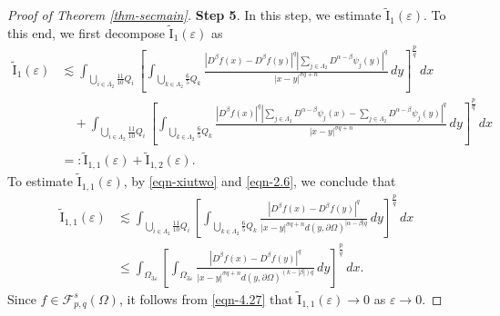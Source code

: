 \documentclass[11pt,twoside]{article}
\def\hf{{\mathscr F }}
\def\Qi{\frac{11}{10}Q_i}
\def\Qkk{\frac{6}{5}Q_k}
\def\az{\alpha}
\def\bz{\beta}
\def\boz{{\Omega}}
\def\sz{\sigma}
\def\vez{\varepsilon}
\def\pa{\partial}                %
\def\huafweab{{\hf}_{p,q}^{s}(\boz)}
\theoremstyle{mylem}
\theoremstyle{definition}
\numberwithin{equation}{section}
\begin{document}
\begin{proof}[Proof of Theorem \ref{thm-secmain}]
{\bf Step 5}. In this step, we estimate \( \tilde{\mathrm{I}}_1(\vez) \). To this end, we first decompose \( \tilde{\mathrm{I}}_1(\vez) \) as
\begin{align*}
\tilde{\mathrm{I}}_1(\vez)
&\lesssim \int_{\bigcup_{i \in \Lambda_2} \Qi} \left[ \int_{\bigcup_{k \in \Lambda_2}\Qkk} \frac{|D^\beta f(x) - D^\beta f(y)|^q |\sum_{j\in\Lambda_2}D^{\alpha - \beta} \psi_j(y)|^q}{|x - y|^{\sz q + n}}\,dy \right]^{\frac{p}{q}}\,dx \\
&\quad+ \int_{\bigcup_{i \in \Lambda_2} \Qi} \left[ \int_{\bigcup_{k \in \Lambda_2} \Qkk} \frac{|D^\beta f(x)|^q |\sum_{j\in\Lambda_2}D^{\alpha - \beta} \psi_j(x) - \sum_{j\in\Lambda_2}D^{\alpha - \beta} \psi_j(y)|^q}{|x - y|^{\sz q + n}}\,dy \right]^{\frac{p}{q}}\,dx \\
&=: \tilde{\mathrm{I}}_{1,1}(\vez) + \tilde{\mathrm{I}}_{1,2}(\vez).
\end{align*}
To estimate \( \tilde{\mathrm{I}}_{1,1}(\vez) \), by \eqref{eqn-xiutwo} and \eqref{eqn-2.6}, we conclude that
\begin{align}\label{eqn-4.27}
\tilde{\mathrm{I}}_{1,1}(\vez)
&\lesssim\int_{\bigcup_{i \in \Lambda_2} \Qi} \left[ \int_{\bigcup_{k \in \Lambda_2} \Qkk} \frac{|D^\beta f(x) - D^\beta f(y)|^q}{|x - y|^{\sz q + n}d(y,\pa\boz)^{|\az-\bz|q}}\,dy \right]^{\frac{p}{q}}\,dx\nonumber\\
&\leq \int_{\Omega_{3\varepsilon}} \left[ \int_{\Omega_{3\varepsilon}} \frac{|D^\beta f(x) - D^\beta f(y)|^q}{|x - y|^{\sz q + n}d(y,\pa\boz)^{(k-|\bz|)q}}\,dy \right]^{\frac{p}{q}}\,dx. 
\end{align}
Since \( f \in \huafweab \), it follows from \eqref{eqn-4.27} that $\tilde{\mathrm{I}}_{1,1}(\vez)\to 0$ as \( \varepsilon \to 0 \).


\end{proof}
\end{document}
